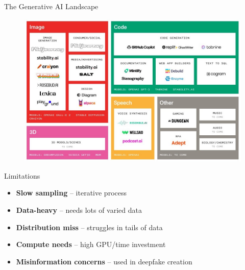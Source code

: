 \begin{frame}{The Generative AI Landscape}
\begin{figure}
    \centering
    \includegraphics[height=0.9\textheight, width=1.05\textwidth, keepaspectratio]{images/diffusion/gen_ai_landscape_2.jpg}
\end{figure}
\end{frame}


\begin{frame}{Limitations}
    \begin{itemize}
        \item \textbf{Slow sampling} – iterative process
        \item \textbf{Data-heavy} – needs lots of varied data
        \item \textbf{Distribution miss} – struggles in tails of data
        \item \textbf{Compute needs} – high GPU/time investment
        \item \textbf{Misinformation concerns} – used in deepfake creation
    \end{itemize}
\end{frame}
